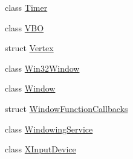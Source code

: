 \begin{DoxyCompactItemize}
class \hyperlink{class_blade_1_1_timer}{Timer}
\item 
class \hyperlink{class_blade_1_1_v_b_o}{V\+BO}
\item 
struct \hyperlink{struct_blade_1_1_vertex}{Vertex}
\item 
class \hyperlink{class_blade_1_1_win32_window}{Win32\+Window}
\item 
class \hyperlink{class_blade_1_1_window}{Window}
\item 
struct \hyperlink{struct_blade_1_1_window_function_callbacks}{Window\+Function\+Callbacks}
\item 
class \hyperlink{class_blade_1_1_windowing_service}{Windowing\+Service}
\item 
class \hyperlink{class_blade_1_1_x_input_device}{X\+Input\+Device}
\end{DoxyCompactItemize}
